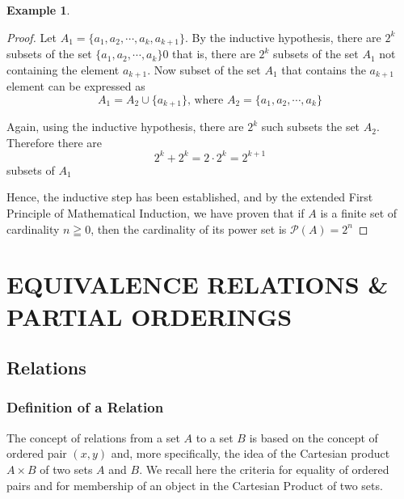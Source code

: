 \documentclass{book}
\theoremstyle{definition}
\newtheorem{example}{Example}[definition]
\theoremstyle{remark}
\newcommand{\m}{\cdot}
\begin{document}
\begin{example}
\begin{proof}
        Let $A_1 = \{a_1, a_2, \cdots , a_k, a_{k+1} \}$. By the inductive hypothesis, there are $2^k$ subsets of the set $\{a_1, a_2, \cdots , a_k \}0$ that is, there are $2^k$ subsets of the set $A_1$ not containing the element $a_{k+1}$. Now subset of the set $A_1$ that contains the $a_{k+1}$ element can be expressed as 
            \begin{equation*}
                A_1 = A_2 \cup \{a_{k+1} \} \text{, where } A_2 = \{a_1, a_2, \cdots , a_k  \}
            \end{equation*}
        
        Again, using the inductive hypothesis, there are $2^k$ such subsets the set $A_2$. Therefore there are 
            \begin{equation*}
                2^k + 2^k = 2 \m 2^k = 2^{k+1}
            \end{equation*}
        subsets of $A_1$
        
        Hence, the inductive step has been established, and by the extended First Principle of Mathematical Induction, we have proven that if $A$ is a finite set of cardinality $n \geqq 0$, then the cardinality of its power set is $\mathcal P \left({A}\right) =2^n$

    \end{proof}
\end{example}







\newpage
\chapter{EQUIVALENCE RELATIONS \& PARTIAL ORDERINGS}

\section{Relations}

\subsection{Definition of a Relation}

    The concept of relations from a set $A$ to a set $B$ is based on the concept of ordered pair $(x,y)$ and, more specifically, the idea of the Cartesian product $A \times B$ of two sets $A$ and $B$. We recall here the criteria for equality of ordered pairs and for membership of an object in the Cartesian Product of two sets. 
    
\end{document}

